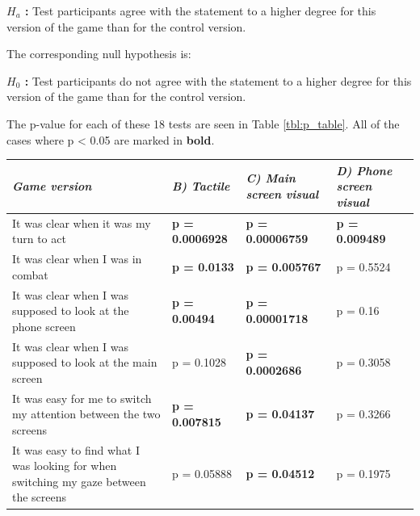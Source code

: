 \begin{changemargin}{1cm}{1cm}
\textbf{$H_a$ :} Test participants agree with the statement to a higher degree for this version of the game than for the control version.
\end{changemargin}

The corresponding null hypothesis is:

\begin{changemargin}{1cm}{1cm}
\textbf{$H_0$ :} Test participants do not agree with the statement to a higher degree for this version of the game than for the control version.
\end{changemargin}

The p-value for each of these 18 tests are seen in Table \ref{tbl:p_table}. All of the cases where p < 0.05 are marked in \textbf{bold}.

\begin{center}
  \begin{tabular*}{\textwidth}{ | p{4.84cm} | p{2.5cm} | p{2.5cm} | p{2.52cm} |}
    \hline
    \textit{Game version} & \textit{B) Tactile} & \textit{C) Main screen visual} & \textit{D) Phone screen visual} \\ \hline
    It was clear when it  was my turn to act & \textbf{p = 0.0006928} & \textbf{p = 0.00006759} & \textbf{p = 0.009489} \\ \hline
    It was clear when I was in combat & \textbf{p = 0.0133} & \textbf{p = 0.005767} & p = 0.5524 \\ \hline
    It was clear when I was supposed to look at the phone screen & \textbf{p = 0.00494} & \textbf{p = 0.00001718} & p = 0.16 \\ \hline
    It was clear when I was supposed to look at the main screen & p = 0.1028 & \textbf{p = 0.0002686} & p = 0.3058 \\ \hline
    It was easy for me to switch my attention between the two screens & \textbf{p = 0.007815} & \textbf{p = 0.04137} & p = 0.3266 \\ \hline
    It was easy to find what I was looking for when switching my gaze between the screens & p = 0.05888 & \textbf{p = 0.04512} & p = 0.1975 \\
    \hline
  \end{tabular*}\label{tbl:p_table}
\end{center}

